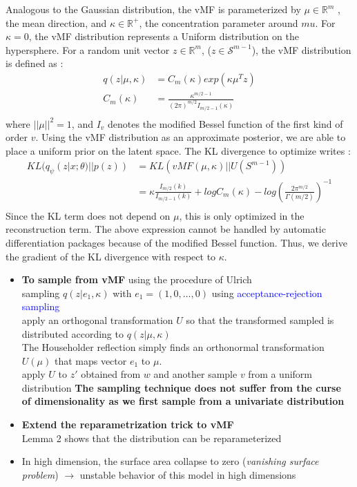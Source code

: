 \documentclass[12pt]{article}
\newcommand{\RR}{\mathbb{R}} %
\newcommand{\blue}[1]{\textcolor{blue}{#1}}
\begin{document}
Analogous to the Gaussian distribution, the vMF is parameterized by $\mu\in\RR^m$ , the mean direction, and $\kappa\in\RR^+$, the concentration parameter around $mu$. For $\kappa=0$, the vMF distribution represents a Uniform distribution on the hypersphere.
For a random unit vector $z\in\RR^m$, ($z\in\mathcal{S}^{m-1}$), the vMF distribution is defined as :
\begin{align*}
    q(z|\mu, \kappa) &= C_m(\kappa) exp(\kappa \mu^T z) \\
    C_m(\kappa) &= \frac{\kappa^{m/2-1}}{(2\pi)^{m/2}I_{m/2-1}(\kappa)} \\
\end{align*}
where $||\mu||^2 =1$, and $I_v$ denotes the modified Bessel function of the first kind of order $v$.
Using the vMF distribution as an approximate posterior, we are able to place a uniform prior on the latent space.
The KL divergence to optimize writes :
\begin{align*}
    KL(q_\psi(z|x; \theta) ||p(z)) &= KL(vMF(\mu, \kappa) || U(S^{m-1})) \\
    &= \kappa\frac{I_{m/2}(k)}{I_{m/2-1}(k)} + log C_m(\kappa) - log\left(\frac{2\pi^{m/2}}{\Gamma(m/2)}\right)^{-1}\\
\end{align*}
Since the KL term does not depend on $\mu$, this is only optimized in the reconstruction term. 
The above expression cannot be handled by automatic differentiation packages because of the modified Bessel function. Thus, we derive the gradient of the KL divergence with respect to $\kappa$. \\ 
\begin{itemize}
    \item \textbf{To sample from vMF} using the procedure of Ulrich \\
        sampling $q(z|e_1, \kappa)$  with $e_1 = (1, 0, \dots, 0)$ using \blue{acceptance-rejection sampling} \\ 
        apply an orthogonal transformation $U$ so that the transformed sampled is distributed according to $q(z|\mu, \kappa)$ \\
        The Householder reflection simply finds an orthonormal transformation $U(\mu)$ that maps vector $e_1$ to $\mu$. \\
        apply $U$ to $z'$ obtained from $w$ and another sample $v$ from a uniform distribution
        \textbf{The sampling technique does not suffer from the curse of dimensionality as we first sample from a univariate distribution}
        
    \item \textbf{Extend the reparametrization trick to vMF}\\ 
    Lemma 2 shows that the distribution can be reparameterized
    \item In high dimension, the surface area collapse to zero (\textit{vanishing surface problem}) $\rightarrow$ unstable behavior of this model in high dimensions
\end{itemize}
\end{document}
